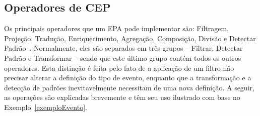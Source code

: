 
\subsection{Operadores de CEP}

\label{sec:CEPoperators}
Os principais operadores que um EPA pode implementar são: Filtragem, Projeção, Tradução, Enriquecimento, Agregação, Composição, Divisão e Detectar Padrão~\citep{Etzion:2010:EPA:1894960}. Normalmente, eles são separados em três grupos -- Filtrar, Detectar Padrão e Transformar -- sendo que este último grupo contém todos os outros operadores. Esta distinção é feita pelo fato de a aplicação de um filtro não precisar alterar a definição do tipo de evento, enquanto que a transformação e a detecção de padrões inevitavelmente necessitam de uma nova definição. A seguir, as operações são explicadas brevemente e têm seu uso ilustrado com base no Exemplo~\ref{exemploEvento}.%



